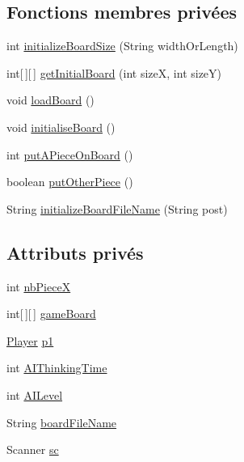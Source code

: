 \subsection*{Fonctions membres privées}
\begin{DoxyCompactItemize}
\item 
int \hyperlink{classcom_1_1publisher_1_1Board_a0521c70e9c0f736bd68576cc2affc3c0}{initialize\-Board\-Size} (String width\-Or\-Length)
\item 
int\mbox{[}$\,$\mbox{]}\mbox{[}$\,$\mbox{]} \hyperlink{classcom_1_1publisher_1_1Board_a04b4464816c504502e12391e4bcc6ebe}{get\-Initial\-Board} (int size\-X, int size\-Y)
\item 
void \hyperlink{classcom_1_1publisher_1_1Board_a60739f30e7e1d11f69a58f9e061c9b8b}{load\-Board} ()
\item 
void \hyperlink{classcom_1_1publisher_1_1Board_a36293fd877866be64fdf58f255631531}{initialise\-Board} ()
\item 
int \hyperlink{classcom_1_1publisher_1_1Board_ac0e541acbb489104d2939dc176d7e485}{put\-A\-Piece\-On\-Board} ()
\item 
boolean \hyperlink{classcom_1_1publisher_1_1Board_a023f18629d44df42621faa5a4352dd90}{put\-Other\-Piece} ()
\item 
String \hyperlink{classcom_1_1publisher_1_1Board_ab3f4c8d80b9e2a586c64de6ffac2dcf6}{initialize\-Board\-File\-Name} (String post)
\end{DoxyCompactItemize}
\subsection*{Attributs privés}
\begin{DoxyCompactItemize}
\item 
int \hyperlink{classcom_1_1publisher_1_1Board_a694af9db45cbdf41ac712245da628de9}{nb\-Piece\-X}
\item 
int\mbox{[}$\,$\mbox{]}\mbox{[}$\,$\mbox{]} \hyperlink{classcom_1_1publisher_1_1Board_a63b25502fe4b514d7d4064ae95ab083a}{game\-Board}
\item 
\hyperlink{classcom_1_1publisher_1_1Player}{Player} \hyperlink{classcom_1_1publisher_1_1Board_a0c709ad0c2ab5f0373caa1c01e5b3f97}{p1}
\item 
int \hyperlink{classcom_1_1publisher_1_1Board_a18b87637c2f76832cb4aeeedcdd555f4}{A\-I\-Thinking\-Time}
\item 
int \hyperlink{classcom_1_1publisher_1_1Board_a81e810a04e627e323650b7962ea9b1a3}{A\-I\-Level}
\item 
String \hyperlink{classcom_1_1publisher_1_1Board_ab16f42342be0746503ac9673303c7555}{board\-File\-Name}
\item 
Scanner \hyperlink{classcom_1_1publisher_1_1Board_a1b738f8b96aa62e1ef25b5390b04594a}{sc}
\end{DoxyCompactItemize}
